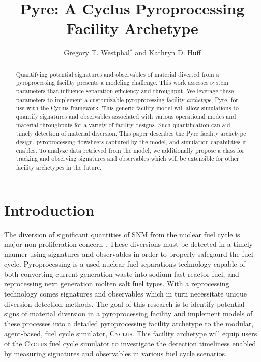 \documentclass{anstrans}
\title{Pyre: A Cyclus Pyroprocessing Facility Archetype}
\author{Gregory T. Westphal$^*$ and Kathryn D. Huff}
\institute{
Dept. of Nuclear, Plasma and Radiological Engineering, University of Illinois at Urbana-Champaign \\
$^*$gtw2@illinois.edu
}
\newcommand{\Cyclus}{\textsc{Cyclus}\xspace}%
\begin{document}
\begin{abstract}
Quantifying potential signatures and observables of material diverted from a 
pyroprocessing facility presents a modeling challenge.
This work assesses system parameters that influence separation efficiency and 
throughput. We leverage these parameters to implement a customizable pyroprocessing facility \emph{archetype}, Pyre, for use with the Cyclus framework.
This generic facility model will allow simulations to 
quantify signatures and observables associated with various operational modes 
and material throughputs for a variety of facility designs. Such quantification 
can aid timely detection of material diversion. 
This paper describes the Pyre facility archetype design, pyroprocessing flowsheets captured by the model, and simulation capabilities it enables. 
To analyze data retrieved from the model, we additionally propose a class for tracking and 
observing signatures and observables which will be extensible for other 
facility archetypes in the future.
\end{abstract}
\section{Introduction}
The diversion of significant quantities of SNM from the nuclear fuel cycle is major non-proliferation 
concern \cite{noauthor_iaea_2017}. These diversions must be detected in a timely manner using signatures and observables in 
order to properly safegaurd the fuel cycle. Pyroprocessing is a used nuclear fuel separations technology capable of both 
converting current generation waste into sodium fast reactor fuel, and reprocessing next generation molten salt fuel types. 
With a reprocessing technology comes signatures and observables which in turn necessitate unique diversion detection methods. 
The goal of this research is to identify potential signs of material diversion in a pyroprocessing facility and implement models 
of these processes into a detailed pyroprocessing facility archetype to the modular, agent-based, fuel cycle simulator, \Cyclus \cite{huff_fundamental_2016}. This facility archetype will equip users of the \Cyclus fuel cycle simulator to investigate the 
detection timeliness enabled by measuring signatures and observables in various fuel cycle scenarios.
\end{document}
